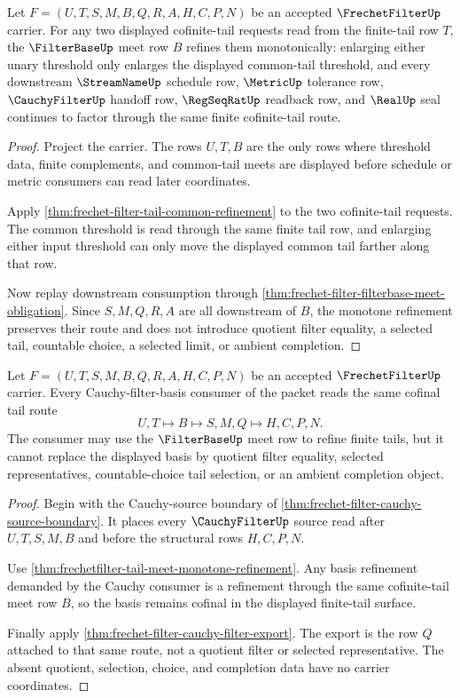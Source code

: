\begin{theorem}
\label{thm:frechetfilter-tail-meet-monotone-refinement}
Let $F=(U,T,S,M,B,Q,R,A,H,C,P,N)$ be an accepted $\FrechetFilterUp$ carrier.
For any two displayed cofinite-tail requests read from the finite-tail row
$T$, the $\FilterBaseUp$ meet row $B$ refines them monotonically: enlarging
either unary threshold only enlarges the displayed common-tail threshold, and
every downstream $\StreamNameUp$ schedule row, $\MetricUp$ tolerance row,
$\CauchyFilterUp$ handoff row, $\RegSeqRatUp$ readback row, and $\RealUp$ seal
continues to factor through the same finite cofinite-tail route.
\end{theorem}
\begin{proof}
Project the carrier. The rows $U,T,B$ are the only rows where threshold data,
finite complements, and common-tail meets are displayed before schedule or
metric consumers can read later coordinates.

Apply \autoref{thm:frechet-filter-tail-common-refinement} to the two
cofinite-tail requests. The common threshold is read through the same finite
tail row, and enlarging either input threshold can only move the displayed
common tail farther along that row.

Now replay downstream consumption through
\autoref{thm:frechet-filter-filterbase-meet-obligation}. Since $S,M,Q,R,A$
are all downstream of $B$, the monotone refinement preserves their route and
does not introduce quotient filter equality, a selected tail, countable
choice, a selected limit, or ambient completion.
\end{proof}

\begin{theorem}
\label{thm:frechetfilter-cauchy-filter-basis-cofinal-route}
Let $F=(U,T,S,M,B,Q,R,A,H,C,P,N)$ be an accepted $\FrechetFilterUp$ carrier.
Every Cauchy-filter-basis consumer of the packet reads the same cofinal tail
route
$$
U,T \longmapsto B \longmapsto S,M,Q \longmapsto H,C,P,N .
$$
The consumer may use the $\FilterBaseUp$ meet row to refine finite tails, but
it cannot replace the displayed basis by quotient filter equality, selected
representatives, countable-choice tail selection, or an ambient completion
object.
\end{theorem}
\begin{proof}
Begin with the Cauchy-source boundary of
\autoref{thm:frechet-filter-cauchy-source-boundary}. It places every
$\CauchyFilterUp$ source read after $U,T,S,M,B$ and before the structural rows
$H,C,P,N$.

Use \autoref{thm:frechetfilter-tail-meet-monotone-refinement}. Any basis
refinement demanded by the Cauchy consumer is a refinement through the same
cofinite-tail meet row $B$, so the basis remains cofinal in the displayed
finite-tail surface.

Finally apply \autoref{thm:frechet-filter-cauchy-filter-export}. The export
is the row $Q$ attached to that same route, not a quotient filter or selected
representative. The absent quotient, selection, choice, and completion data
have no carrier coordinates.
\end{proof}

